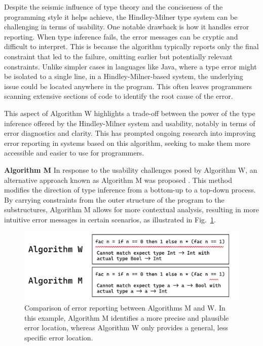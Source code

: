 Despite the seismic influence of type theory and the conciseness of the programming style it helps achieve,  the Hindley-Milner type system can be challenging in terms of usability. One notable drawback is how it handles error reporting. When type inference fails, the error messages can be cryptic and difficult to interpret. This is because the algorithm typically reports only the final constraint that led to the failure, omitting earlier but potentially relevant constraints. Unlike simpler cases in languages like Java, where a type error might be isolated to a single line, in a Hindley-Milner-based system, the underlying issue could be located anywhere in the program. This often leaves programmers scanning extensive sections of code to identify the root cause of the error. 

This aspect of Algorithm W highlights a trade-off between the power of the type inference offered by the Hindley-Milner system and usability, notably in terms of error diagnostics and clarity. This has prompted ongoing research into improving error reporting in systems based on this algorithm, seeking to make them more accessible and easier to use for programmers.

\textbf{Algorithm M} 
In response to the usability challenges posed by Algorithm W, an alternative approach known as Algorithm M was proposed \cite{Lee1998-fx}. This method modifies the direction of type inference from a bottom-up to a top-down process. By carrying constraints from the outer structure of the program to the substructures, Algorithm M allows for more contextual analysis, resulting in more intuitive error messages in certain scenarios, as illustrated in Fig.~\ref{fig:algorithm-m-1}. 

\begin{figure}[hbt]
  \centering
  \includegraphics[width=0.8\linewidth]{AlgorithmWM1.pdf}
  \caption[Comparison of error reporting between Algorithms M and W]{
    \label{fig:algorithm-m-1}
    Comparison of error reporting between Algorithms M and W. In this example, Algorithm M identifies a more precise and plausible error location, whereas Algorithm W only provides a general, less specific error location.}
\end{figure}


